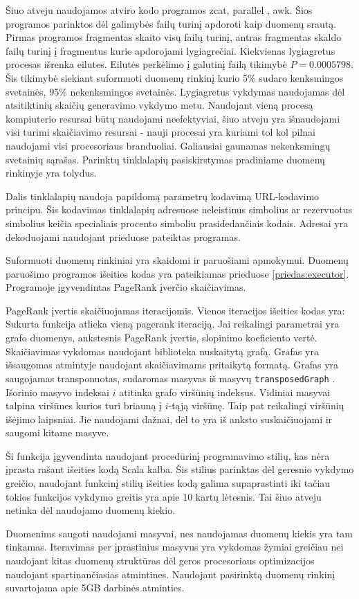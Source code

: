 Šiuo atveju naudojamos atviro kodo programos zcat, parallel \cite{parallel}, awk. Šios programos parinktos
dėl galimybės failų turinį apdoroti kaip duomenų srautą.   Pirmas programos fragmentas skaito visų failų turinį,
antras fragmentas skaldo failų turinį į fragmentus kurie apdorojami lygiagrečiai. Kiekvienas lygiagretus procesas
išrenka eilutes. Eilutės perkėlimo į galutinį failą tikimybė $P = 0.0005798$. Šis tikimybė siekiant suformuoti
duomenų rinkinį kurio 5\% sudaro kenksmingos svetainės, 95\% nekenksmingos svetainės. Lygiagretus vykdymas
naudojamas dėl atsitiktinių skaičių generavimo vykdymo metu. Naudojant vieną procesą kompiuterio resursai būtų
naudojami neefektyviai, šiuo atveju yra išnaudojami visi turimi skaičiavimo resursai - nauji procesai yra
kuriami tol kol pilnai naudojami visi procesoriaus branduoliai. Galiausiai gaunamas nekenksmingų svetainių
sąrašas. Parinktų tinklalapių pasiskirstymas pradiniame duomenų rinkinyje yra tolydus.

Dalis tinklalapių naudoja papildomą parametrų kodavimą URL-kodavimo principu. Šis kodavimas tinklalapių adresuose
neleistinus simbolius ar rezervuotus simbolius keičia specialiais procento simboliu prasidedančiais kodais.
Adresai yra dekoduojami naudojant prieduose pateiktas programas.


Suformuoti duomenų rinkiniai yra skaidomi ir paruošiami apmokymui. Duomenų paruošimo programos išeities
kodas yra pateikiamas prieduose \ref{priedas:executor}. Programoje įgyvendintas PageRank įverčio skaičiavimas.

PageRank įvertis skaičiuojamas iteracijomis. Vienos iteracijos išeities kodas yra:
Sukurta funkcija atlieka vieną pagerank iteraciją. Jai reikalingi  parametrai yra grafo duomenys, ankstesnis
PageRank įvertis, slopinimo koeficiento vertė. Skaičiavimas vykdomas naudojant biblioteka \cite{webgraph} nuskaitytą
grafą. Grafas yra išsaugomas atmintyje naudojant skaičiavimams pritaikytą formatą. Grafas yra saugojamas
transponuotas, sudaromas masyvas iš masyvų \texttt{transposedGraph} . Išorinio masyvo indeksai $i$ atitinka
grafo viršūnių indeksus. Vidiniai masyvai talpina viršūnes kurios turi briauną į $i$-tąją viršūnę. Taip pat
reikalingi viršūnių išėjimo laipsniai. Jie naudojami dažnai, dėl to yra iš anksto suskaičiuojami ir saugomi kitame masyve.

Ši funkcija įgyvendinta naudojant procedūrinį programavimo stilių, kas nėra įprasta rašant išeities kodą Scala
kalba. Šis stilius parinktas dėl geresnio vykdymo greičio, naudojant funkcinį stilių išeities kodą galima
supaprastinti iki
tačiau tokios funkcijos vykdymo greitis yra apie 10 kartų lėtesnis. Tai šiuo atveju netinka dėl naudojamo duomenų kiekio.

Duomenims saugoti naudojami masyvai, nes naudojamas duomenų kiekis yra tam tinkamas. Iteravimas per
įprastinius masyvus yra vykdomas žymiai greičiau nei naudojant kitas duomenų struktūras dėl geros
procesoriaus optimizacijos naudojant spartinančiasias atmintines. Naudojant pasirinktą duomenų
rinkinį suvartojama apie 5GB darbinės atminties.